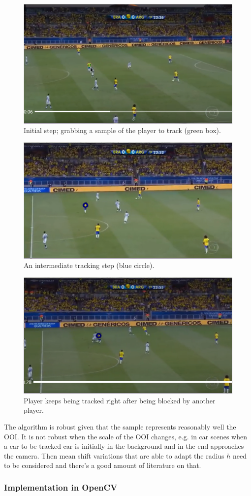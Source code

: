 \documentclass[a4paper]{article}
\begin{document}
\begin{multicols}{3}
\begin{figure}[H]
    \centering
    \includegraphics[width=.33\textwidth]{img/mean_shift/out_my_ms1.png}
    \caption{Initial step; grabbing a sample of the player to track (green box).}
\end{figure}
\columnbreak
\begin{figure}[H]
    \centering
    \includegraphics[width=.33\textwidth]{img/mean_shift/out_my_ms2.png}
    \caption{An intermediate tracking step (blue circle).}
\end{figure}
\columnbreak
\begin{figure}[H]
    \centering
    \includegraphics[width=.33\textwidth]{img/mean_shift/out_my_ms3.png}
    \caption{Player keeps being tracked right after being blocked by another player.}
\end{figure}
\columnbreak
\end{multicols}


The algorithm is robust given that the sample represents reasonably well the OOI. It is not robust when the scale of the OOI changes, e.g. in car scenes when a car to be tracked car is initially in the background and in the end approaches the camera. Then mean shift variations that are able to adapt the radius $h$ need to be considered and there's a good amount of literature on that.


\subsubsection{Implementation in OpenCV}
\end{document}
